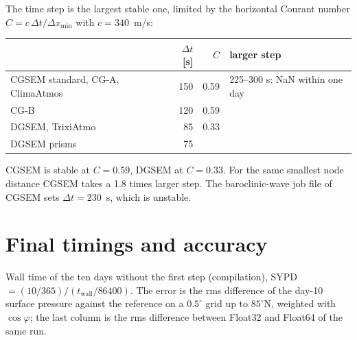 \documentclass[11pt,a4paper]{article}
\begin{document}
The time step is the largest stable one, limited by the horizontal Courant
number $C=c\,\Delta t/\Delta x_\text{min}$ with $c=340$~m/s:

\begin{center}
\small
\begin{tabular}{lrrl}
\toprule
 & $\Delta t$ [s] & $C$ & larger step \\
\midrule
CGSEM standard, CG-A, ClimaAtmos & 150 & 0.59 & 225--300 s: NaN within one day \\
CG-B           & 120 & 0.59 & \\
DGSEM, TrixiAtmo & 85 & 0.33 & \\
DGSEM prisms   & 75  & & \\
\bottomrule
\end{tabular}
\end{center}

\noindent CGSEM is stable at $C=0.59$, DGSEM at $C=0.33$. For the same
smallest node distance CGSEM takes a 1.8 times larger step. The
baroclinic-wave job file of CGSEM sets $\Delta t=230$~s, which is
unstable.

\section{Final timings and accuracy}

Wall time of the ten days without the first step (compilation),
SYPD $=(10/365)/(t_\text{wall}/86400)$. The error is the rms difference of
the day-10 surface pressure against the reference on a $0.5^\circ$ grid up
to $85^\circ$N, weighted with $\cos\varphi$; the last column is the
rms difference between Float32 and Float64 of the same run.
\end{document}
